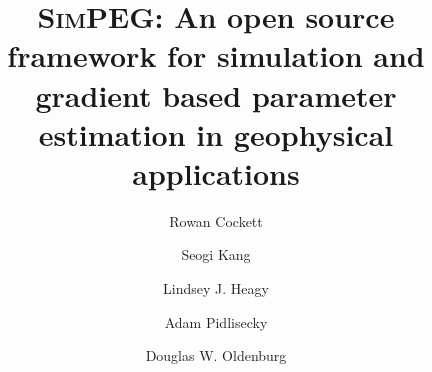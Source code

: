 \documentclass[preprint,review,3p,times,onecolumn,authoryear]{elsarticle}
\newcommand{\SimPEG}{\textsc{SimPEG}\xspace}
\begin{document}
\begin{frontmatter}



{%
\title{\SimPEG: An open source framework for simulation and gradient based
parameter estimation in geophysical applications}

\author[UBC1]{Rowan Cockett}
\author[UBC]{Seogi Kang}
\author[UBC]{Lindsey J. Heagy}
\author[UofC]{Adam Pidlisecky}
\author[UBC]{Douglas W. Oldenburg}

\address[UBC1]{Corresponding Author. Phone: 1(604)358-7696, Email: rcockett[at]eos.ubc.ca}
\address[UBC]{Geophysical Inversion Facility, University of British Columbia}
\address[UofC]{University of Calgary}

\begin{abstract}


\end{abstract}}
\end{frontmatter}
\end{document}
